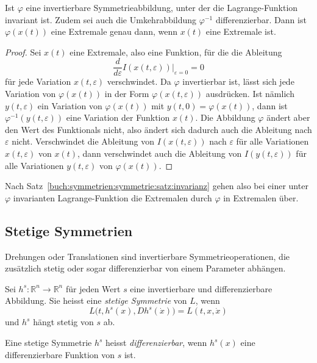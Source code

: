 \begin{satz}
\label{buch:symmetrien:symmetrie:satz:invarianz}
Ist $\varphi$ eine invertierbare Symmetrieabbildung, unter der die
Lagrange-Funktion invariant ist.
Zudem sei auch die Umkehrabbildung $\varphi^{-1}$ differenzierbar.
Dann ist $\varphi(x(t))$ eine Extremale genau dann, wenn $x(t)$ eine
Extremale ist.
\end{satz}

\begin{proof}
Sei $x(t)$ eine Extremale, also eine Funktion, für die die Ableitung
\[
\frac{d}{d\varepsilon}I(x(t,\varepsilon))
\bigg|_{\varepsilon=0}
=
0
\]
für jede Variation $x(t,\varepsilon)$ verschwindet.
Da $\varphi$ invertierbar ist, lässt sich jede Variation von
$\varphi(x(t))$ in der Form $\varphi(x(t,\varepsilon))$ ausdrücken.
Ist nämlich $y(t,\varepsilon)$ ein Variation von $\varphi(x(t))$
mit $y(t,0) = \varphi(x(t))$, dann ist $\varphi^{-1}(y(t,\varepsilon))$
eine Variation der Funktion $x(t)$.
Die Abbildung $\varphi$ ändert aber den Wert des Funktionals nicht,
also ändert sich dadurch auch die Ableitung nach $\varepsilon$ nicht.
Verschwindet die Ableitung von $I(x(t,\varepsilon))$ nach $\varepsilon$
für alle Variationen $x(t,\varepsilon)$ von $x(t)$, dann verschwindet
auch die Ableitung von $I(y(t,\varepsilon))$ für alle Variationen
$y(t,\varepsilon)$ von $\varphi(x(t))$.
\end{proof}

Nach Satz~\ref{buch:symmetrien:symmetrie:satz:invarianz} gehen 
also bei einer unter $\varphi$ invarianten Lagrange-Funktion die
Extremalen durch $\varphi$ in Extremalen über.

%
%
\subsection{Stetige Symmetrien}
Drehungen oder Translationen sind invertierbare Symmetrieoperationen,
die zusätzlich stetig oder sogar differenzierbar von einem Parameter
abhängen.

\begin{definition}
%
%
Sei $h^s\colon \mathbb{R}^n\to\mathbb{R}^n$ für jeden Wert $s$
eine invertierbare und differenzierbare Abbildung.
Sie heisst eine {\em stetige Symmetrie} von $L$, wenn
\[
L\bigl(t, h^s(x), Dh^s(\dot{x})\bigr)
=
L(t,x,\dot{x})
\]
und $h^s$ hängt stetig von $s$ ab.
\end{definition}

\begin{definition}
Eine stetige Symmetrie 
$h^s$ heisst {\em differenzierbar}, wenn $h^s(x)$
%
%
eine differenzierbare Funktion von $s$ ist.
\end{definition}

